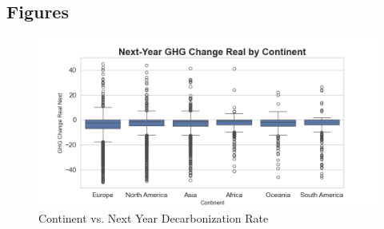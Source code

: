 

\subsection{Figures}

\begin{figure}[H]
\centering
  \includegraphics[width=\textwidth]{figures/ghg_change_real_next_by_continent.png}
\caption{Continent vs. Next Year Decarbonization Rate}
\label{fig:continent_vs_ghg_change_real_next}
\end{figure}

